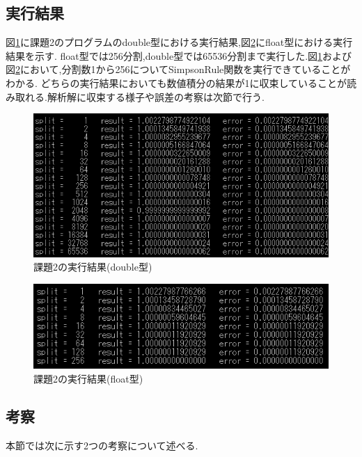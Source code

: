 \documentclass[dvipdfmx]{jarticle}
\begin{document}
    \subsection{実行結果}
    図\ref{kadai2d}に課題2のプログラムのdouble型における実行結果,図\ref{kadai2f}にfloat型における実行結果を示す.
    float型では256分割,double型では65536分割まで実行した.図\ref{kadai2d}および図\ref{kadai2f}において,分割数1から256についてSimpsonRule関数を実行できていることがわかる.
    どちらの実行結果においても数値積分の結果が1に収束していることが読み取れる.解析解に収束する様子や誤差の考察は次節で行う.
    \begin{figure}[H]
      \centering
      \includegraphics[scale=0.9]{kadai2double.png}
      \caption{課題2の実行結果(double型)}
       \label{kadai2d}
      \end{figure}

      \begin{figure}[H]
        \centering
        \includegraphics[scale=0.9]{kadai2float.png}
        \caption{課題2の実行結果(float型)}
         \label{kadai2f}
        \end{figure}

    \subsection{考察}
    本節では次に示す2つの考察について述べる.
\end{document}
